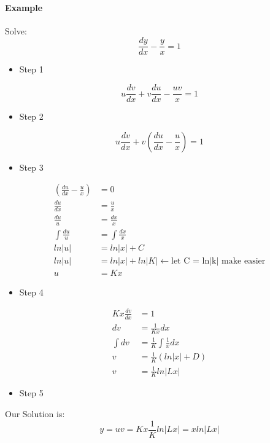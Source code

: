 \paragraph{Example} Solve:
\[
\frac{dy}{dx} - \frac{y}{x}= 1
\]
\begin{itemize}
	\item Step 1
\end{itemize}
\[
u\frac{dv}{dx} + v \frac{du}{dx} - \frac{uv}{x}= 1
\]
\begin{itemize}
	\item Step 2
\end{itemize}
\[
u\frac{dv}{dx} + v( \frac{du}{dx} - \frac{u}{x})= 1
\]
\begin{itemize}
	\item Step 3
\end{itemize}
\[
\begin{split}
	( \frac{du}{dx} - \frac{u}{x}) &= 0  \\
	\frac{du}{dx} &= \frac{u}{x} \\
	\frac{du}{u} &= \frac{dx}{x} \\
	\int \frac{du}{u} &= \int \frac{dx}{x} \\
	ln|u| &= ln|x| + C \\
	ln|u| &= ln|x| + ln|K| \leftarrow \text{let C = ln|k| make easier} \\
	u &= Kx
\end{split}
\]
\begin{itemize}
	\item Step 4
\end{itemize}
\[
\begin{split}
	Kx\frac{dv}{dx} &= 1 \\
	dv &= \frac{1}{Kx} dx \\
	\int dv &= \frac{1}{K}\int \frac{1}{x} dx \\
	v &= \frac{1}{K} (ln|x| + D) \\
	v &= \frac{1}{K} ln|Lx|
\end{split}
\]
\begin{itemize}
	\item Step 5
\end{itemize}
Our Solution is:
\[
y = uv = Kx\frac{1}{K} ln|Lx| = xln|Lx|
\]


